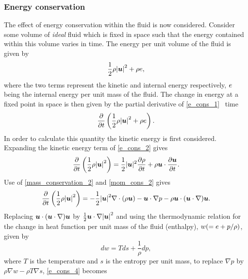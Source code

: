 \subsubsection{Energy conservation}
The effect of energy conservation within the fluid is now considered. Consider some volume of \textit{ideal} fluid which is fixed in space such that the energy contained within this volume varies in time. The energy per unit volume of the fluid is given by
\begin{equation}\label{e_cons_1}
 \frac{1}{2}\rho{|{\mbox{\boldmath$u$}}|}^{2}+\rho e,
\end{equation}
where the two terms represent the kinetic and internal energy respectively, $e$ being the internal energy per unit mass of the fluid. The change in energy at a fixed point in space is then given by the partial derivative of \eqref{e_cons_1} \wrt\ time
\begin{equation}\label{e_cons_2}
 \frac{\partial}{\partial{t}}\left(\frac{1}{2}\rho{|{\mbox{\boldmath$u$}}|}^{2}+\rho e\right).
\end{equation}
In order to calculate this quantity the kinetic energy is first considered. Expanding the kinetic energy term of \eqref{e_cons_2} gives
\begin{equation}\label{e_cons_3}
 \frac{\partial}{\partial{t}}\left(\frac{1}{2}\rho{|{\mbox{\boldmath$u$}}|}^{2}\right)=\frac{1}{2}|{\mbox{\boldmath$u$}}|^{2}\frac{\partial\rho}{\partial{t}}+
                                                                 \rho{\mbox{\boldmath$u$}}\cdot\frac{\partial{\mbox{\boldmath$u$}}}{\partial{t}}.
\end{equation}
Use of \eqref{mass_conservation_2} and \eqref{mom_cons_2} gives
\begin{equation}\label{e_cons_4}
 \frac{\partial}{\partial{t}}\left(\frac{1}{2}\rho{|{\mbox{\boldmath$u$}}|}^{2}\right)=-\frac{1}{2}{|{\mbox{\boldmath$u$}}|}^{2}\nabla\cdot(\rho{\mbox{\boldmath$u$}})
                                                                  -{\mbox{\boldmath$u$}}\cdot\nabla{p}
                                                                  -\rho{\mbox{\boldmath$u$}}\cdot({\mbox{\boldmath$u$}}\cdot\nabla){\mbox{\boldmath$u$}}.
\end{equation}
Replacing ${\mbox{\boldmath$u$}}\cdot({\mbox{\boldmath$u$}}\cdot\nabla){\mbox{\boldmath$u$}}$ by ${\textstyle \frac{1}{2}}{\mbox{\boldmath$u$}}\cdot\nabla{|{\mbox{\boldmath$u$}}|}^{2}$ and using the thermodynamic relation for the change in heat function per unit mass of the fluid (enthalpy), $w(=e+p/\rho)$,  given by \citep{landau}
\begin{equation}\label{e_cons_5}
 dw=Tds+\frac{1}{\rho}dp,
\end{equation}
where $T$ is the temperature and $s$ is the entropy per unit mass, to replace $\nabla{p}$ by $\rho\nabla{w}-\rho{T}\nabla{s}$, \eqref{e_cons_4} becomes
